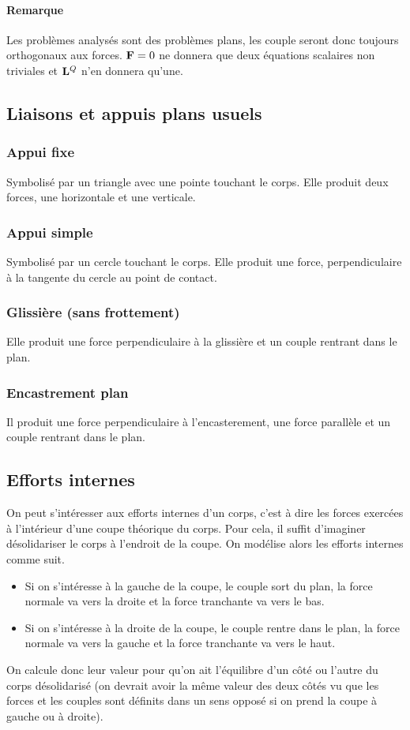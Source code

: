 \paragraph{Remarque}
Les problèmes analysés sont des problèmes plans, les couple seront donc toujours orthogonaux aux forces.
${\bf F} = 0$ ne donnera que deux équations scalaires non triviales et ${\bf L}^Q$ n'en donnera qu'une.

\subsection{Liaisons et appuis plans usuels}
\subsubsection{Appui fixe}
Symbolisé par un triangle avec une pointe touchant le corps.
Elle produit deux forces, une horizontale et une verticale.

\subsubsection{Appui simple}
Symbolisé par un cercle touchant le corps.
Elle produit une force, perpendiculaire à la tangente du cercle au point de contact.

\subsubsection{Glissière (sans frottement)}
Elle produit une force perpendiculaire à la glissière et un couple rentrant dans le plan.

\subsubsection{Encastrement plan}
Il produit une force perpendiculaire à l'encasterement, une force parallèle et un couple rentrant dans le plan.

\subsection{Efforts internes}
On peut s'intéresser aux efforts internes d'un corps, c'est à dire les forces exercées à l'intérieur d'une coupe théorique du corps.
Pour cela, il suffit d'imaginer désolidariser le corps à l'endroit de la coupe.
On modélise alors les efforts internes comme suit.
\begin{itemize}
	\item Si on s'intéresse à la gauche de la coupe, le couple sort du plan, la force normale va vers la droite et la force tranchante va vers le bas.
	\item Si on s'intéresse à la droite de la coupe, le couple rentre dans le plan, la force normale va vers la gauche et la force tranchante va vers le haut.
\end{itemize}
On calcule donc leur valeur pour qu'on ait l'équilibre d'un côté ou l'autre du corps désolidarisé (on devrait avoir la même valeur des deux côtés vu que les forces et les couples sont définits dans un sens opposé si on prend la coupe à gauche ou à droite).

